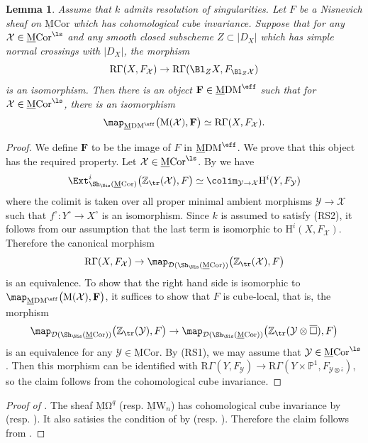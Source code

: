 \documentclass{amsart}
\theoremstyle{plain}
\newtheorem{lemma}[theorem]{Lemma}
\theoremstyle{definition}
\theoremstyle{remark}
\numberwithin{equation}{section}
\def\bcube{{\overline{\square}}}
\def\RGamma{\mathrm{R}\Gamma}
\def\MCor{\mathrm{\underline{M}Cor}}
\def\MDM{\mathrm{\underline{M}DM}}
\def\MOmega{\mathrm{\underline{M}\Omega}}
\def\MW{\underline{\mathrm{M}}\mathrm{W}}
\begin{document}
\begin{lemma}\label{general_realization}
    Assume that $k$ admits resolution of singularities.
    Let $F$ be a Nisnevich sheaf on $\MCor$ which has cohomological cube invariance.
    Suppose that for any $\mathcal{X}\in \MCor^\ls$ and any smooth closed subscheme $Z\subset|D_X|$ which has simple normal crossings with $|D_X|$, the morphism
    $$
         \RGamma(X,F_\mathcal{X})\to \RGamma(\Bl_ZX,F_{\Bl_Z\mathcal{X}})
    $$
    is an isomorphism.
    Then there is an object $\mathbf{F}\in \MDM^\eff$ such that for $\mathcal{X}\in \MCor^\ls$, there is an isomorphism
	$$
		\map_{\MDM^\eff}\bigl(\mathrm{M}(\mathcal{X}),\mathbf{F}\bigr) \simeq \RGamma(X,F_\mathcal{X}).
	$$
\end{lemma}

\begin{proof}
    We define $\mathbf{F}$ to be the image of $F$ in $\MDM^\eff$.
    We prove that this object has the required property.
    Let $\mathcal{X}\in \MCor^\ls$.
	By \cite[Theorem 4.6.3]{KMSY1} we have
	\begin{align*}
		\Ext^i_{\Sh_\Nis(\MCor)}\bigl(\mathbb{Z}_\tr(\mathcal{X}),F\bigr)\simeq \colim_{\mathcal{Y}\to \mathcal{X}} \mathrm{H}^i(Y,F_\mathcal{Y})
	\end{align*}
	where the colimit is taken over all proper minimal ambient morphisms $\mathcal{Y}\to \mathcal{X}$ such that $f^\circ\colon Y^\circ\to X^\circ$ is an isomorphism.
	Since $k$ is assumed to satisfy (RS2), it follows from our assumption that the last term is isomorphic to $\mathrm{H}^i(X,F_\mathcal{X})$.
	Therefore the canonical morphism
	$$
		\mathrm{R}\Gamma(X,F_\mathcal{X})\to \map_{\mathcal{D}(\Sh_\Nis(\MCor))} \bigl(\mathbb{Z}_\tr(\mathcal{X}),F\bigr)
	$$
	is an equivalence.
    To show that the right hand side is isomorphic to $\map_{\MDM^\eff}\bigl(\mathrm{M}(\mathcal{X}),\mathbf{F}\bigr)$, it suffices to show that $F$ is cube-local, that is, the morphism
	$$
		\map_{\mathcal{D}(\Sh_\Nis(\MCor))} \bigl(\mathbb{Z}_\tr(\mathcal{Y}),F\bigr)\to
		\map_{\mathcal{D}(\Sh_\Nis(\MCor))} \bigl(\mathbb{Z}_\tr(\mathcal{Y}\otimes\bcube),F\bigr)
	$$
	is an equivalence for any $\mathcal{Y}\in \MCor$.
	By (RS1), we may assume that $\mathcal{Y}\in \MCor^\ls$.
	Then this morphism can be identified with $\mathrm{R}\Gamma(Y,F_\mathcal{Y})\to \mathrm{R}\Gamma(Y\times\mathbb{P}^1,F_\mathcal{Y\otimes\bcube})$, so the claim follows from the cohomological cube invariance.
\end{proof}

\begin{proof}[Proof of ]
    The sheaf $\MOmega^q$ (resp. $\MW_n$) has cohomological cube invariance by  (resp. ).
    It also satisies the condition of  by  (resp. ).
    Therefore the claim follows from .
\end{proof}



\printbibliography
\end{document}
